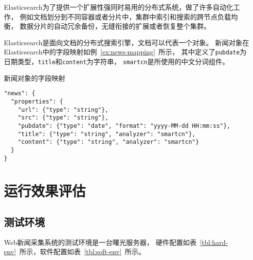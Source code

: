 Elasticsearch为了提供一个扩展性强同时易用的分布式系统，做了许多自动化工作，
例如文档划分到不同容器或者分片中，集群中索引和搜索的跨节点负载均衡，
数据分片的自动冗余备份，无缝衔接的扩展或者恢复整个集群。

Elasticsearch是面向文档的分布式搜索引擎，文档可以代表一个对象。
新闻对象在Elasticsearch中的字段映射如例~\ref{ex:news-mapping}~所示，
其中定义了\texttt{pubdate}为日期类型，\texttt{title}和\texttt{content}为字符串，
\texttt{smartcn}是所使用的中文分词组件。

\begin{example}
\label{ex:news-mapping}
新闻对象的字段映射
\end{example}
\begin{oframed}
\begin{verbatim}
"news": {
  "properties": {
    "url": {"type": "string"},
    "src": {"type": "string"},
    "pubdate": {"type": "date", "format": "yyyy-MM-dd HH:mm:ss"},
    "title": {"type": "string", "analyzer": "smartcn"},
    "content": {"type": "string", "analyzer": "smartcn"}
  }
}
\end{verbatim}
\end{oframed}

\section{运行效果评估}
\label{sec:system-evaluation}

\subsection{测试环境}

Web新闻采集系统的测试环境是一台曙光服务器，
硬件配置如表~\ref{tbl:hard-env}~所示，软件配置如表~\ref{tbl:soft-env}~所示。

